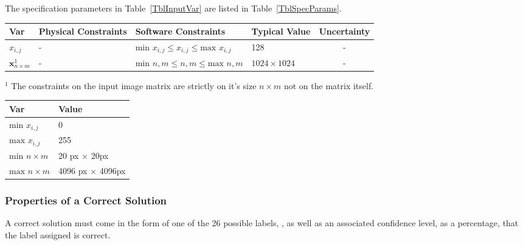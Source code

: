 \documentclass[12pt]{article}
\begin{document}
The specification parameters in Table~\ref{TblInputVar} are listed in
Table~\ref{TblSpecParams}.

\begin{table}[!h]
  \caption{Input Variables} \label{TblInputVar}
  \renewcommand{\arraystretch}{1.2}
\noindent \begin{longtable*}{l l l l c} 
  \toprule
  \textbf{Var} & \textbf{Physical Constraints} & \textbf{Software Constraints} &
                             \textbf{Typical Value} & \textbf{Uncertainty}\\
  \midrule 
  $x_{i,j}$& - & ${\text{min }} x_{i,j} \leq x_{i,j} \leq {\text{max }} x_{i,j}$ & 128 & -
  \\
  $\mathbf{x}_{n \times m}^1$& - & ${\text{min }} n, m \leq n, m \leq {\text{max }} n, m$ & $1024 \times 1024$ & -
  \\
  \bottomrule
\end{longtable*}
\end{table}

\noindent 
\begin{description}
\item $^1$ The constraints on the input image matrix are strictly on it's size $n \times m$ not on the matrix itself.
\end{description}

\begin{table}[!h]
\caption{Specification Parameter Values} \label{TblSpecParams}
\renewcommand{\arraystretch}{1.2}
\noindent \begin{longtable*}{l l} 
  \toprule
  \textbf{Var} & \textbf{Value} \\
  \midrule 
  $\text{min } x_{i,j}$ & 0\\
  $\text{max } x_{i,j}$ & 255\\
  $\text{min } n \times m$ & 20 px $\times$ 20px\\
  $\text{max } n \times m$ & 4096 px $\times$ 4096px\\
  \bottomrule
\end{longtable*}
\end{table}

\subsubsection{Properties of a Correct Solution} \label{sec_CorrectSolution}

\noindent
A correct solution must come in the form of one of the 26 possible labels,
, as well as an associated 
confidence level, as a percentage, that the label assigned is correct.
\end{document}
